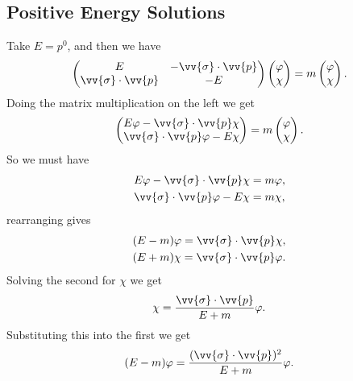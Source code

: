 \documentclass[fleqn]{NotesClass}
\begin{document}
    \subsection{Positive Energy Solutions}
    Take \(E = p^0\), and then we have
    \begin{equation}
        \begin{pmatrix}
            E & -\vv{\sigma} \cdot \vv{p}\\
            \vv{\sigma} \cdot \vv{p} & -E
        \end{pmatrix}
        \begin{pmatrix}
            \varphi\\ \chi
        \end{pmatrix}
        = m
        \begin{pmatrix}
            \varphi\\ \chi
        \end{pmatrix}
        .
    \end{equation}
    Doing the matrix multiplication on the left we get
    \begin{equation}
        \begin{pmatrix}
            E\varphi - \vv{\sigma} \cdot \vv{p} \chi\\
            \vv{\sigma} \cdot \vv{p}\varphi - E\chi
        \end{pmatrix}
        = m
        \begin{pmatrix}
            \varphi\\ \chi
        \end{pmatrix}
        .
    \end{equation}
    So we must have
    \begin{align}
        E\varphi - \vv{\sigma} \cdot \vv{p}\chi &= m\varphi,\\
        \vv{\sigma} \cdot \vv{p}\varphi - E\chi &= m\chi,
    \end{align}
    rearranging gives
    \begin{align}
        (E - m)\varphi = \vv{\sigma} \cdot \vv{p}\chi,\\
        (E + m)\chi = \vv{\sigma} \cdot \vv{p}\varphi.
    \end{align}
    Solving the second for \(\chi\) we get
    \begin{equation}
        \chi = \frac{\vv{\sigma} \cdot \vv{p}}{E + m} \varphi.
    \end{equation}
    Substituting this into the first we get
    \begin{equation}
        (E - m)\varphi = \frac{(\vv{\sigma} \cdot \vv{p})^2}{E + m}\varphi.
    \end{equation}
\end{document}
